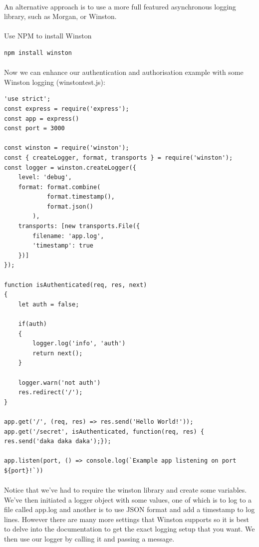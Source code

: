 \documentclass[10pt, a4paper, twosize]{article}
\begin{document}
\paragraph{} An alternative approach is to use a more full featured asynchronous logging library, such as Morgan, or Winston.

\paragraph{} Use NPM to install Winston
\begin{lstlisting}
npm install winston
\end{lstlisting}

\paragraph{} Now we can enhance our authentication and authorisation example with some Winston logging (winstontest.js):
\begin{lstlisting}
'use strict';
const express = require('express');
const app = express()
const port = 3000

const winston = require('winston');
const { createLogger, format, transports } = require('winston');
const logger = winston.createLogger({
    level: 'debug',
    format: format.combine(
            format.timestamp(),
            format.json()
        ),
    transports: [new transports.File({
        filename: 'app.log',
        'timestamp': true
    })]
});

function isAuthenticated(req, res, next)
{
    let auth = false;

    if(auth)
    {
        logger.log('info', 'auth')
        return next();
    }

    logger.warn('not auth')
    res.redirect('/');
}

app.get('/', (req, res) => res.send('Hello World!'));
app.get('/secret', isAuthenticated, function(req, res) { res.send('daka daka daka');});

app.listen(port, () => console.log(`Example app listening on port ${port}!`))
\end{lstlisting}
\paragraph{} Notice that we've had to require the winston library and create some variables. We've then initiated a logger object with some values, one of which is to log to a file called app.log and another is to use JSON format and add a timestamp to log lines. However there are many more settings that Winston supports so it is best to delve into the documentation to get the exact logging setup that you want. We then use our logger by calling it and passing a message.
\end{document}
